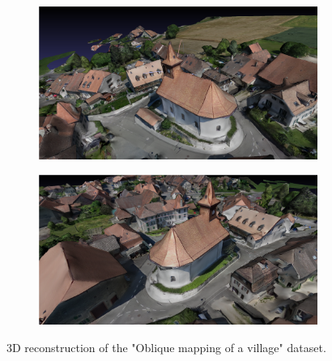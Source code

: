  \begin{figure}
\centering
\begin{subfigure}{.5\textwidth}
  \centering
  \includegraphics[width=\linewidth]{figs/church1.png}
  
\end{subfigure}%
\begin{subfigure}{.5\textwidth}
  \centering
  \includegraphics[width=\linewidth]{figs/church2.png}

\end{subfigure}
\caption{3D reconstruction of the "Oblique mapping of a village" dataset\cite{datasets}.}
\label{fig:church}
\end{figure}

